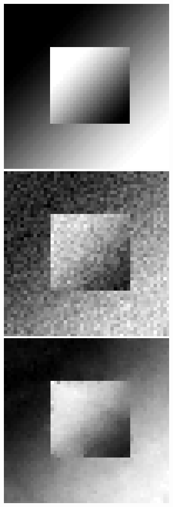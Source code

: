 \begin{figure}[!h]
\center
\includegraphics[scale=.25]{figures/epbp/denoisingExpleORIG}
\hspace*{.3cm}
\includegraphics[scale=.25]{figures/epbp/denoisingExpleINPUT}
\hspace*{.3cm}
\includegraphics[scale=.25]{figures/epbp/denoisingExpleRECO}

\end{figure}
